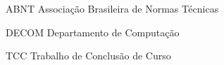 \renewcommand{\cftdotsep}{1}
\begin{siglas}
	\item[ABNT] Associação Brasileira de Normas Técnicas
	\item[DECOM] Departamento de Computação
	\item[TCC] Trabalho de Conclusão de Curso
\end{siglas}
